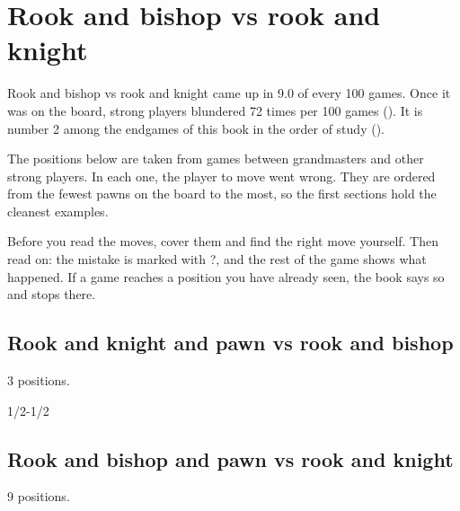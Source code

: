 \chapter{Rook and bishop vs rook and knight}\label{ch:rook-and-bishop-vs-rook-and-knight}
Rook and bishop vs rook and knight came up in 9.0 of every 100 games. Once it was on the board, strong players blundered 72 times per 100 games (). It is number 2 among the endgames of this book in the order of study ().

The positions below are taken from games between grandmasters and other strong players. In each one, the player to move went wrong. They are ordered from the fewest pawns on the board to the most, so the first sections hold the cleanest examples.

Before you read the moves, cover them and find the right move yourself. Then read on: the mistake is marked with ?, and the rest of the game shows what happened. If a game reaches a position you have already seen, the book says so and stops there.


\section{Rook and knight and pawn vs rook and bishop}
3 positions.


1/2-1/2\par
\section{Rook and bishop and pawn vs rook and knight}
9 positions.

